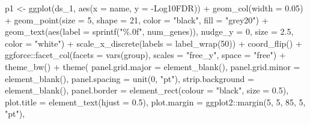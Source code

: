 \documentclass[
  11pt,
  oneside]{book}
\newenvironment{Shaded}{\begin{snugshade}}{\end{snugshade}}
\newcommand{\AttributeTok}[1]{\textcolor[rgb]{0.77,0.63,0.00}{#1}}
\newcommand{\DecValTok}[1]{\textcolor[rgb]{0.00,0.00,0.81}{#1}}
\newcommand{\FloatTok}[1]{\textcolor[rgb]{0.00,0.00,0.81}{#1}}
\newcommand{\FunctionTok}[1]{\textcolor[rgb]{0.00,0.00,0.00}{#1}}
\newcommand{\NormalTok}[1]{#1}
\newcommand{\OtherTok}[1]{\textcolor[rgb]{0.56,0.35,0.01}{#1}}
\newcommand{\SpecialCharTok}[1]{\textcolor[rgb]{0.00,0.00,0.00}{#1}}
\newcommand{\StringTok}[1]{\textcolor[rgb]{0.31,0.60,0.02}{#1}}
\begin{document}
\begin{Shaded}
\begin{Highlighting}[]
\NormalTok{p1 }\OtherTok{\textless{}{-}} \FunctionTok{ggplot}\NormalTok{(ds\_1, }\FunctionTok{aes}\NormalTok{(}\AttributeTok{x =}\NormalTok{ name, }\AttributeTok{y =} \StringTok{\textasciigrave{}}\AttributeTok{{-}Log10FDR}\StringTok{\textasciigrave{}}\NormalTok{)) }\SpecialCharTok{+}
  \FunctionTok{geom\_col}\NormalTok{(}\AttributeTok{width =} \FloatTok{0.05}\NormalTok{) }\SpecialCharTok{+}
  \FunctionTok{geom\_point}\NormalTok{(}\AttributeTok{size =} \DecValTok{5}\NormalTok{, }\AttributeTok{shape =} \DecValTok{21}\NormalTok{, }\AttributeTok{color =} \StringTok{"black"}\NormalTok{, }\AttributeTok{fill =} \StringTok{"grey20"}\NormalTok{) }\SpecialCharTok{+}
  \FunctionTok{geom\_text}\NormalTok{(}\FunctionTok{aes}\NormalTok{(}\AttributeTok{label =} \FunctionTok{sprintf}\NormalTok{(}\StringTok{"\%.0f"}\NormalTok{, num\_genes)), }\AttributeTok{nudge\_y =} \DecValTok{0}\NormalTok{, }\AttributeTok{size =} \FloatTok{2.5}\NormalTok{, }\AttributeTok{color =} \StringTok{"white"}\NormalTok{) }\SpecialCharTok{+}
  \FunctionTok{scale\_x\_discrete}\NormalTok{(}\AttributeTok{labels =} \FunctionTok{label\_wrap}\NormalTok{(}\DecValTok{50}\NormalTok{)) }\SpecialCharTok{+}
  \FunctionTok{coord\_flip}\NormalTok{() }\SpecialCharTok{+}
\NormalTok{  ggforce}\SpecialCharTok{::}\FunctionTok{facet\_col}\NormalTok{(}\AttributeTok{facets =} \FunctionTok{vars}\NormalTok{(group), }\AttributeTok{scales =} \StringTok{"free\_y"}\NormalTok{, }\AttributeTok{space =} \StringTok{"free"}\NormalTok{) }\SpecialCharTok{+}
  \FunctionTok{theme\_bw}\NormalTok{() }\SpecialCharTok{+}
  \FunctionTok{theme}\NormalTok{(}
    \AttributeTok{panel.grid.major =} \FunctionTok{element\_blank}\NormalTok{(),}
    \AttributeTok{panel.grid.minor =} \FunctionTok{element\_blank}\NormalTok{(),}
    \AttributeTok{panel.spacing =} \FunctionTok{unit}\NormalTok{(}\DecValTok{0}\NormalTok{, }\StringTok{"pt"}\NormalTok{),}
    \AttributeTok{strip.background =} \FunctionTok{element\_blank}\NormalTok{(),}
    \AttributeTok{panel.border =} \FunctionTok{element\_rect}\NormalTok{(}\AttributeTok{colour =} \StringTok{"black"}\NormalTok{, }\AttributeTok{size =} \FloatTok{0.5}\NormalTok{),}
    \AttributeTok{plot.title =} \FunctionTok{element\_text}\NormalTok{(}\AttributeTok{hjust =} \FloatTok{0.5}\NormalTok{),}
    \AttributeTok{plot.margin =}\NormalTok{ ggplot2}\SpecialCharTok{::}\FunctionTok{margin}\NormalTok{(}\DecValTok{5}\NormalTok{, }\DecValTok{5}\NormalTok{, }\DecValTok{85}\NormalTok{, }\DecValTok{5}\NormalTok{, }\StringTok{"pt"}\NormalTok{),}

\end{Highlighting}
\end{Shaded}
\end{document}
